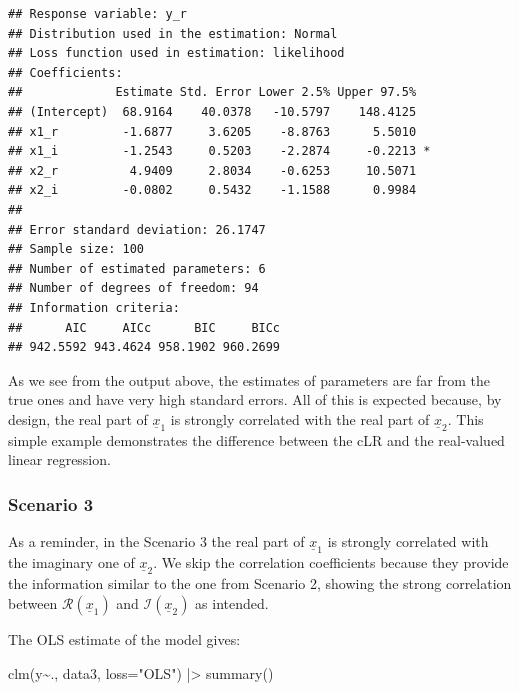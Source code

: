\documentclass[
]{book}
\newenvironment{Shaded}{\begin{snugshade}}{\end{snugshade}}
\newcommand{\AttributeTok}[1]{\textcolor[rgb]{0.77,0.63,0.00}{#1}}
\newcommand{\FunctionTok}[1]{\textcolor[rgb]{0.00,0.00,0.00}{#1}}
\newcommand{\NormalTok}[1]{#1}
\newcommand{\SpecialCharTok}[1]{\textcolor[rgb]{0.00,0.00,0.00}{#1}}
\newcommand{\StringTok}[1]{\textcolor[rgb]{0.31,0.60,0.02}{#1}}
\begin{document}
\begin{verbatim}
## Response variable: y_r
## Distribution used in the estimation: Normal
## Loss function used in estimation: likelihood
## Coefficients:
##             Estimate Std. Error Lower 2.5% Upper 97.5%  
## (Intercept)  68.9164    40.0378   -10.5797    148.4125  
## x1_r         -1.6877     3.6205    -8.8763      5.5010  
## x1_i         -1.2543     0.5203    -2.2874     -0.2213 *
## x2_r          4.9409     2.8034    -0.6253     10.5071  
## x2_i         -0.0802     0.5432    -1.1588      0.9984  
## 
## Error standard deviation: 26.1747
## Sample size: 100
## Number of estimated parameters: 6
## Number of degrees of freedom: 94
## Information criteria:
##      AIC     AICc      BIC     BICc 
## 942.5592 943.4624 958.1902 960.2699
\end{verbatim}

As we see from the output above, the estimates of parameters are far from the true ones and have very high standard errors. All of this is expected because, by design, the real part of \(\underline{x}_1\) is strongly correlated with the real part of \(\underline{x}_2\). This simple example demonstrates the difference between the cLR and the real-valued linear regression.

\hypertarget{scenario-3}{%
\subsubsection*{Scenario 3}\label{scenario-3}}

As a reminder, in the Scenario 3 the real part of \(\underline{x}_{1}\) is strongly correlated with the imaginary one of \(\underline{x}_{2}\). We skip the correlation coefficients because they provide the information similar to the one from Scenario 2, showing the strong correlation between \(\mathcal{R}\left(\underline{x}_{1}\right)\) and \(\mathcal{I}\left(\underline{x}_{2}\right)\) as intended.

The OLS estimate of the model gives:

\begin{Shaded}
\begin{Highlighting}[]
\FunctionTok{clm}\NormalTok{(y}\SpecialCharTok{\textasciitilde{}}\NormalTok{., data3, }\AttributeTok{loss=}\StringTok{"OLS"}\NormalTok{) }\SpecialCharTok{|\textgreater{}}
    \FunctionTok{summary}\NormalTok{()}
\end{Highlighting}
\end{Shaded}
\end{document}

